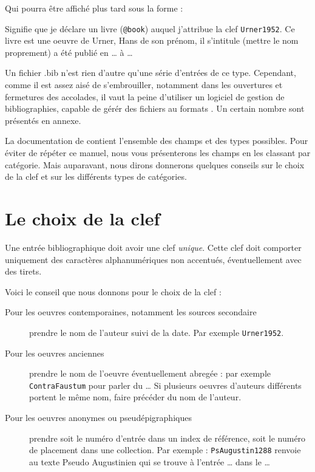Qui pourra être affiché plus tard sous la forme :

\begin{quote}
\cite{Urner1952}
\end{quote}


Signifie que je déclare un livre (\verb|@book|) auquel j'attribue la clef \verb|Urner1952|. Ce livre est une oeuvre de Urner, Hans de son prénom, il s'intitule (mettre le nom proprement) a été publié en … à …

Un fichier .bib n'est rien d'autre qu'une  série d'entrées de ce type. Cependant, comme il est assez aisé de s'embrouiller, notamment dans les ouvertures et fermetures des accolades, il vaut la peine d'utiliser un logiciel de gestion de bibliographies, capable de gérér  des fichiers au formats . Un certain nombre sont présentés en annexe.

La documentation de  contient l'ensemble des champs et des types possibles. Pour éviter de répéter ce manuel, nous vous présenterons les champs en les classant par catégorie. Mais auparavant, nous dirons donnerons quelques conseils sur le choix de la clef et sur les différents types de catégories.

\section{Le choix de la clef}

Une entrée bibliographique doit avoir une clef \emph{unique}. Cette clef doit comporter uniquement des caractères alphanumériques non accentués, éventuellement avec des tirets. 

Voici le conseil que nous donnons pour le choix de la clef :
\begin{description}
\item[Pour les oeuvres contemporaines, notamment les sources secondaire] prendre le nom de l'auteur suivi de la date. Par exemple \verb|Urner1952|.
\item[Pour les oeuvres anciennes] prendre le nom de l'oeuvre  éventuellement abregée : par exemple \verb|ContraFaustum| pour parler du … Si plusieurs oeuvres d'auteurs différents portent le même nom, faire précéder du nom de l'auteur.
\item[Pour les oeuvres anonymes ou pseudépigraphiques] prendre soit le numéro d'entrée dans un index de référence, soit le numéro de placement dans une collection. Par exemple : \verb|PsAugustin1288| renvoie au texte Pseudo Augustinien qui se trouve à l'entrée … dans le …
\end{description}


